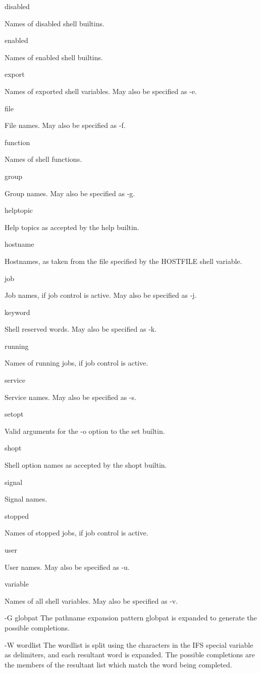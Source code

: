 disabled

Names of disabled shell builtins.

enabled

Names of enabled shell builtins.

export

Names of exported shell variables. May also be specified as -e.

file

File names. May also be specified as -f.

function

Names of shell functions.

group

Group names. May also be specified as -g.

helptopic

Help topics as accepted by the help builtin.

hostname

Hostnames, as taken from the file specified by the HOSTFILE shell variable.

job

Job names, if job control is active. May also be specified as -j.

keyword

Shell reserved words. May also be specified as -k.

running

Names of running jobs, if job control is active.

service

Service names. May also be specified as -s.

setopt

Valid arguments for the -o option to the set builtin.

shopt

Shell option names as accepted by the shopt builtin.

signal

Signal names.

stopped

Names of stopped jobs, if job control is active.

user

User names. May also be specified as -u.

variable

Names of all shell variables. May also be specified as -v.

-G globpat
The pathname expansion pattern globpat is expanded to generate the possible completions.

-W wordlist
The wordlist is split using the characters in the IFS special variable as delimiters, and each resultant word is expanded. The possible completions are the members of the resultant list which match the word being completed.

